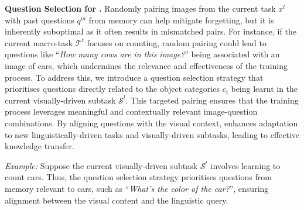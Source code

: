 \noindent\textbf{Question Selection for \qstmethodshort{}. }  
Randomly pairing images from the current task \(x^{t}\) with past questions \(q^{m}\) from memory can help mitigate forgetting, but it is inherently suboptimal as it often results in mismatched pairs. For instance, if the current macro-task \(\mathcal{T}^t\) focuses on counting, random pairing could lead to questions like ``\textit{How many cows are in this image?}'' being associated with an image of cars, which undermines the relevance and effectiveness of the training process. To address this, we introduce a question selection strategy that prioritises questions directly related to the object categories \(c_i\) being learnt in the current visually-driven subtask \(\mathcal{S}^l\). This targeted pairing ensures that the training process leverages meaningful and contextually relevant image-question combinations. By aligning questions with the visual context, \qstmethodshort{} enhances adaptation to new linguistically-driven tasks and visually-driven subtasks, leading to effective knowledge transfer.

\noindent \textit{Example:} Suppose the current visually-driven subtask 
$\mathcal{S}^t$ involves learning to count cars. Thus, the question selection strategy prioritises questions from memory relevant to cars, such as ``\textit{What’s the color of the car?}'', ensuring alignment between the visual content and the linguistic query.

